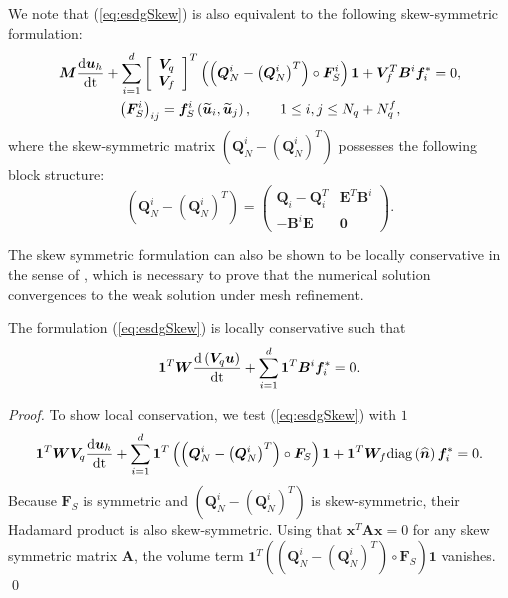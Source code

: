 \documentclass{svjour3}                     %
\renewcommand{\hat}{\widehat}
\renewcommand{\tilde}{\widetilde}
\newcommand{\diag}[1]{{\rm diag}\LRp{#1}}
\newcommand{\td}[2]{\frac{{\rm d}#1}{{\rm d}{\rm #2}}}
\newcommand{\LRp}[1]{\left( #1 \right)}
\newcommand{\LRs}[1]{\left[ #1 \right]}
\begin{document}
\begin{remark}
We note that (\ref{eq:esdgSkew}) is also equivalent to the following skew-symmetric formulation:
\begin{gather}
\bm{M}\td{\bm{u}_h}{t} + \sum_{i=1}^d\LRs{\begin{array}{c}
\bm{V}_q \\ \bm{V}_f\end{array}}^T 
\LRp{\LRp{\bm{Q}^i_N - \LRp{\bm{Q}^i_N}^T} \circ \bm{F}^i_S}\bm{1} + \bm{V}_f^T\bm{B}^i\bm{f}_i^* = 0,  \label{eq:esdgSkew2}\\
\LRp{\bm{F}^i_S}_{ij} = \bm{f}^i_S\LRp{\tilde{\bm{u}}_i,\tilde{\bm{u}}_j}, \qquad 1\leq i,j\leq N_q + N^f_q,\nonumber
\end{gather}
where the skew-symmetric matrix $\LRp{\bm{Q}^i_N - \LRp{\bm{Q}^i_N}^T}$ possesses the following block structure:
\[
\LRp{\bm{Q}^i_N - \LRp{\bm{Q}^i_N}^T} = \begin{pmatrix}
\bm{Q}_i-\bm{Q}_i^T & {\bm{E}}^T \bm{B}^i\\
-\bm{B}^i\bm{E} & \bm{0}
\end{pmatrix}.
\]
\end{remark}


The skew symmetric formulation can also be shown to be locally conservative in the sense of \cite{shi2017local}, which is necessary to prove that the numerical solution convergences to the weak solution under mesh refinement.  
\begin{theorem}
The formulation (\ref{eq:esdgSkew}) is locally conservative such that
\begin{align}
\bm{1}^T\bm{W}\td{\LRp{\bm{V}_q\bm{u}}}{t} + \sum_{i=1}^d\bm{1}^T\bm{B}^i\bm{f}_i^* = 0. 
\end{align}
\end{theorem}
\begin{proof}
To show local conservation, we test (\ref{eq:esdgSkew}) with $1$
\begin{align}
\bm{1}^T\bm{W}\bm{V}_q\td{\bm{u}_h}{t} + \sum_{i=1}^d
\bm{1}^T
\LRp{\LRp{\bm{Q}^i_N - \LRp{\bm{Q}^i_N}^T} \circ \bm{F}_S}\bm{1} + \bm{1}^T\bm{W}_f \diag{\hat{\bm{n}}}\bm{f}_i^* = 0. 
\end{align}
Because $\bm{F}_S$ is symmetric and $\LRp{\bm{Q}^i_N - \LRp{\bm{Q}^i_N}^T}$ is skew-symmetric, their Hadamard product is also skew-symmetric.  Using that $\bm{x}^T\bm{A}\bm{x} = 0$ for any skew symmetric matrix $\bm{A}$, the volume term $\bm{1}^T\LRp{\LRp{\bm{Q}^i_N - \LRp{\bm{Q}^i_N}^T} \circ \bm{F}_S}\bm{1}$ vanishes.
\qed\end{proof}
\end{document}
